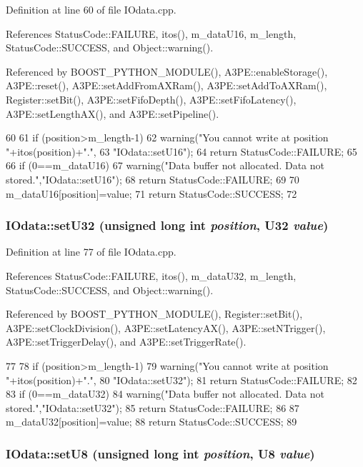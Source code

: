 Definition at line 60 of file IOdata.cpp.

References StatusCode::FAILURE, itos(), m\_\-dataU16, m\_\-length, StatusCode::SUCCESS, and Object::warning().

Referenced by BOOST\_\-PYTHON\_\-MODULE(), A3PE::enableStorage(), A3PE::reset(), A3PE::setAddFromAXRam(), A3PE::setAddToAXRam(), Register::setBit(), A3PE::setFifoDepth(), A3PE::setFifoLatency(), A3PE::setLengthAX(), and A3PE::setPipeline().


\begin{DoxyCode}
60                                                               {
61   if (position>m_length-1){
62     warning("You cannot write at position "+itos(position)+".",
63         "IOdata::setU16");
64     return StatusCode::FAILURE;
65   }
66   if (0==m_dataU16){
67     warning("Data buffer not allocated. Data not stored.","IOdata::setU16");
68     return StatusCode::FAILURE;
69   }
70   m_dataU16[position]=value;
71   return StatusCode::SUCCESS;
72 }
\end{DoxyCode}
\hypertarget{classIOdata_abbed9a057203bc763f97b85fb385f36b}{
\subsubsection[{setU32}]{ IOdata::setU32 (unsigned long int {\em position}, \/  {\bf U32} {\em value})}}
\label{classIOdata_abbed9a057203bc763f97b85fb385f36b}


Definition at line 77 of file IOdata.cpp.

References StatusCode::FAILURE, itos(), m\_\-dataU32, m\_\-length, StatusCode::SUCCESS, and Object::warning().

Referenced by BOOST\_\-PYTHON\_\-MODULE(), Register::setBit(), A3PE::setClockDivision(), A3PE::setLatencyAX(), A3PE::setNTrigger(), A3PE::setTriggerDelay(), and A3PE::setTriggerRate().


\begin{DoxyCode}
77                                                               {
78   if (position>m_length-1){
79     warning("You cannot write at position "+itos(position)+".",
80         "IOdata::setU32");
81     return StatusCode::FAILURE;
82   }
83   if (0==m_dataU32){
84     warning("Data buffer not allocated. Data not stored.","IOdata::setU32");
85     return StatusCode::FAILURE;
86   }
87   m_dataU32[position]=value;
88   return StatusCode::SUCCESS;
89 }
\end{DoxyCode}
\hypertarget{classIOdata_a6c4fb2f2af01889ada889c2b7aceb24d}{
\subsubsection[{setU8}]{ IOdata::setU8 (unsigned long int {\em position}, \/  {\bf U8} {\em value})}}
\label{classIOdata_a6c4fb2f2af01889ada889c2b7aceb24d}


